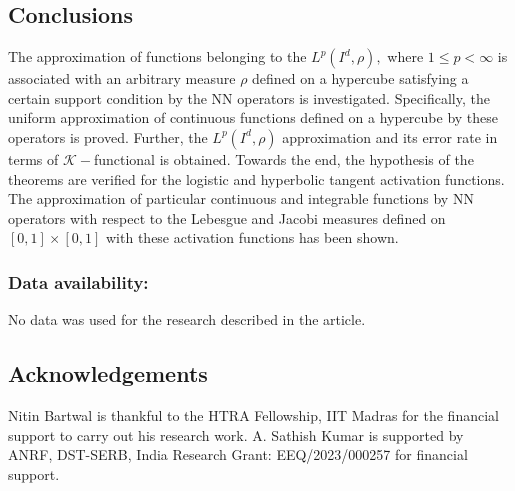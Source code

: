 \documentclass[12pt, reqno]{amsart}
\numberwithin{equation}{section}
\theoremstyle{definition}
\theoremstyle{remark}
\numberwithin{equation}{section}
\begin{document}
\subsection{Conclusions}
The approximation of functions belonging to the $L^p(I^d,\rho),$ where $1\leq p<\infty$ is associated with an arbitrary measure $\rho$ defined on a hypercube satisfying a certain support condition by the NN operators is investigated. 
Specifically, the uniform approximation of continuous functions defined on a hypercube by these operators is proved. Further, the $L^p(I^d,\rho)$ approximation and its error rate in terms of $\mathcal{K}-$functional is obtained. 
Towards the end, the hypothesis of the theorems are verified for the logistic and hyperbolic tangent activation functions. The approximation of particular continuous and integrable functions by NN operators with respect to the Lebesgue and Jacobi measures defined on $[0,1]\times[0,1]$ with these activation functions has been shown. 

  
\vspace{3mm}
\subsubsection*{\bf Data availability:}
\noindent No data was used for the research described in the article.

 \subsection*{Acknowledgements}

\noindent
 Nitin Bartwal is thankful to the HTRA Fellowship, IIT Madras for the financial support to carry out his research work.
\noindent 
A. Sathish Kumar is supported by ANRF, DST-SERB, India Research Grant: EEQ/2023/000257 for financial support. 
\end{document}
